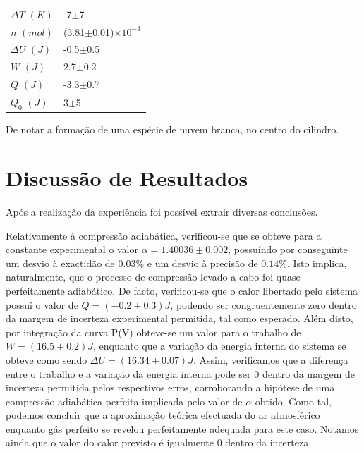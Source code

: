 \documentclass[9pt]{extarticle}
\begin{document}
\begin{multicols}{2}
\begin{center}
\begin{tabular}{ x{2cm} x{3cm} }
\hline \hline
$\Delta T$ $(K)$ & -7$\pm$7 \tabularnewline
$n$ $(mol)$ & (3.81$\pm$0.01)$\times10^{-3}$ \tabularnewline
$\Delta U$ $(J)$ & -0.5$\pm$0.5 \tabularnewline
$W$ $(J)$ & 2.7$\pm$0.2 \tabularnewline
$Q$ $(J)$ & -3.3$\pm$0.7 \tabularnewline
$Q_0$ $(J)$ & 3$\pm$5 \tabularnewline
\hline \hline
\end{tabular}
\end{center}

\par De notar a formação de uma espécie de nuvem branca, no centro do cilindro.

\section{Discussão de Resultados}

\par Após a realização da experiência foi possível extrair diversas conclusões.

\par Relativamente à compressão adiabática, verificou-se que se obteve para a constante experimental o valor $\alpha=1.40036\pm0.002$, possuíndo por conseguinte um desvio à exactidão de $0.03\%$ e um desvio à precisão de $0.14\%$. Isto implica, naturalmente, que o processo de compressão levado a cabo foi quase perfeitamente adiabático. De facto, verificou-se que o calor libertado pelo sistema possui o valor de $Q=(-0.2\pm0.3)J$, podendo ser congruentemente zero dentro da margem de incerteza experimental permitida, tal como esperado. Além disto, por integração da curva P(V) obteve-se um valor para o trabalho de $W=(16.5\pm0.2)J$, enquanto que a variação da energia interna do sistema se obteve como sendo $\Delta U=(16.34\pm0.07)J$. Assim, verificamos que a diferença entre o trabalho e a variação da energia interna pode ser 0 dentro da margem de incerteza permitida pelos respectivos erros, corroborando a hipótese de uma compressão adiabática perfeita implicada pelo valor de $\alpha$ obtido. Como tal, podemos concluir que a aproximação teórica efectuada do ar atmosférico enquanto gás perfeito se revelou perfeitamente adequada para este caso. Notamos ainda que o valor do calor previsto é igualmente 0 dentro da incerteza.


\end{multicols}
\end{document}

